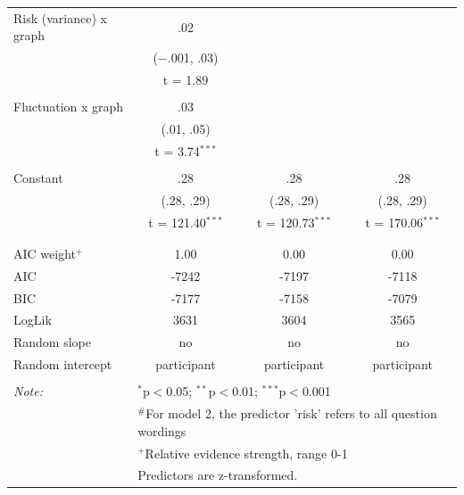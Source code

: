 \begin{table}[!htbp]
\begin{tabular}{@{\extracolsep{5pt}}lccc}
 Risk (variance) x graph & .02 & & \\ 
 & ($-$.001, .03) & & \\ 
 & t = 1.89 & & \\ 
 & & & \\ 
 Fluctuation x graph & .03 & & \\ 
 & (.01, .05) & & \\ 
 & t = 3.74$^{***}$ & & \\ 
 & & & \\ \midrule
 Constant & .28 & .28 & .28 \\ 
 & (.28, .29) & (.28, .29) & (.28, .29) \\ 
 & t = 121.40$^{***}$ & t = 120.73$^{***}$ & t = 170.06$^{***}$ \\ 
 & & & \\ 
\hline \\[-1.8ex] 
AIC weight$^{+}$ & 1.00 & 0.00 & 0.00 \\ 
AIC & -7242 & -7197 & -7118 \\ 
BIC & -7177 & -7158 & -7079 \\ 
LogLik & 3631 & 3604 & 3565 \\ 
Random slope & no & no & no \\ 
Random intercept & participant & participant & participant \\ 
\hline 
\hline \\[-1.8ex] 
\textit{Note:} & \multicolumn{3}{l}{$^{*}$p$<$0.05; $^{**}$p$<$0.01; $^{***}$p$<$0.001} \\ 
 & \multicolumn{3}{l}{$^{\#}$For model 2, the predictor 'risk' refers to all question wordings} \\ 
 & \multicolumn{3}{l}{$^{+}$Relative evidence strength, range 0-1 {\citep{Wagenmakers2004}}} \\ 
 & \multicolumn{3}{l}{Predictors are z-transformed.} \\ 
\end{tabular} 
\end{table} 



